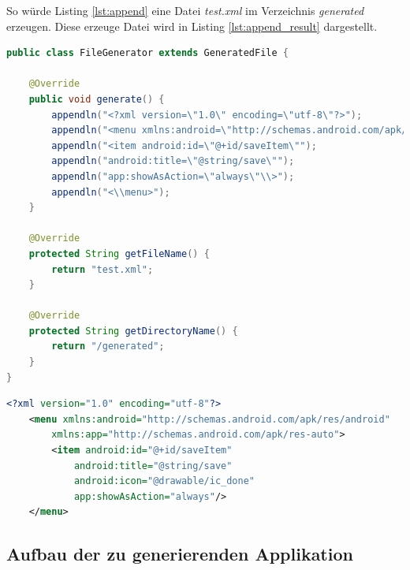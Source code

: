 So würde Listing \ref{lst:append} eine Datei \textit{test.xml} im Verzeichnis \textit{generated} erzeugen. Diese erzeuge Datei wird in Listing \ref{lst:append_result} dargestellt.

\begin{lstlisting}[label=lst:append,
language=java,
firstnumber=1,
caption=Beispiel eine GeneratedFile-Instanz zur Erzeugung einer XML-Datei.]				   
public class FileGenerator extends GeneratedFile {

	@Override
	public void generate() {
		appendln("<?xml version=\"1.0\" encoding=\"utf-8\"?>");
		appendln("<menu xmlns:android=\"http://schemas.android.com/apk/res/android\" xmlns:app=\"http://schemas.android.com/apk/res-auto\">");
		appendln("<item android:id=\"@+id/saveItem\"");
		appendln("android:title=\"@string/save\"");
		appendln("app:showAsAction=\"always\"\\>");
		appendln("<\\menu>");
	}

	@Override
	protected String getFileName() {
		return "test.xml";
	}

	@Override
	protected String getDirectoryName() {
		return "/generated";
	}
}
\end{lstlisting}

\begin{lstlisting}[label=lst:append_result,
language=xml,
firstnumber=1,
caption=Erzeugte XML-Datei durch den Quellcode von Listing \ref{lst:append}.]				   
<?xml version="1.0" encoding="utf-8"?>
	<menu xmlns:android="http://schemas.android.com/apk/res/android"
		xmlns:app="http://schemas.android.com/apk/res-auto">
		<item android:id="@+id/saveItem"
			android:title="@string/save"
			android:icon="@drawable/ic_done"
			app:showAsAction="always"/>
	</menu>
\end{lstlisting}

\subsection{Aufbau der zu generierenden Applikation}


